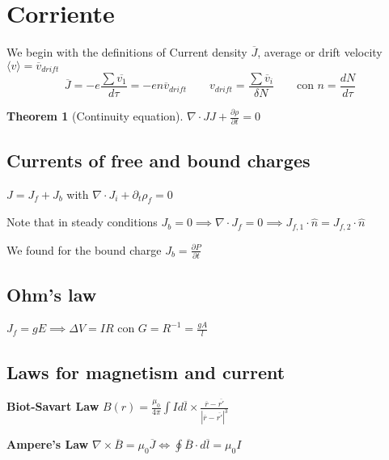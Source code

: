 \documentclass{myclass}
\newtheorem*{theorem}{Theorem}
\begin{document}
\section{Corriente}
We begin with the definitions of Current density $\overline{J}$, average or drift velocity $\langle v \rangle = \overline{v}_{drift} $
\[
\overline{J} = -e\frac{\sum\overline{v_1}}{d\tau} = -en\overline{v}_{drift} \qquad v_{drift} = \frac{\sum \overline{v}_i }{\delta N} \qquad  \text{con } n = \frac{dN}{d\tau }  
\] 

\begin{theorem}[Continuity equation] $\displaystyle \nabla\cdot JJ+ \frac{\partial \rho }{\partial t} = 0$
\end{theorem}

\subsection{Currents of free and bound charges}
$J = J_f + J_b$ with  $\nabla\cdot J_i + \partial_t \rho _f = 0$

Note that in steady conditions $J_b = 0 \implies \nabla\cdot J_f = 0 \implies J_{f, 1}\cdot \hat{n} = J_{f, 2}\cdot \hat{n}$

We found for the bound charge $\boxed{J_b = \frac{\partial P}{\partial t}}$

 \subsection{Ohm's law}
 $J_f = gE \implies \Delta V = IR$ con $G = R^{-1} = \frac{gA}{l}$


\subsection{Laws for magnetism and current}
\textbf{Biot-Savart Law} $\displaystyle \boxed{B(r) = \frac{\mu_0}{4\pi}\int Id\overline{l}\times \frac{\overline{r}-\overline{r'}}{|\overline{r}-\overline{r'}|^3}}$

\textbf{Ampere's Law} $\displaystyle \boxed{\nabla\times \overline{B} = \mu_0 \overline{J} \iff \oint \overline{B}\cdot d\overline{l} = \mu_0 I}$
\end{document}
